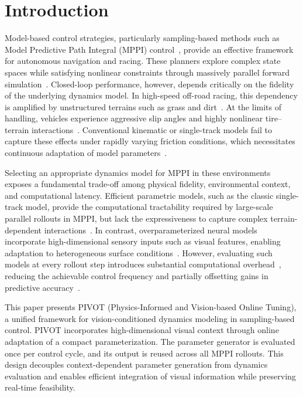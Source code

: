 \chapter{Introduction}
\label{sec:introduction}

Model-based control strategies, particularly sampling-based methods such as Model Predictive Path Integral (MPPI) control~\cite{williams2017model}, provide an effective framework for autonomous navigation and racing. These planners explore complex state spaces while satisfying nonlinear constraints through massively parallel forward simulation~\cite{williams2018information}. Closed-loop performance, however, depends critically on the fidelity of the underlying dynamics model. In high-speed off-road racing, this dependency is amplified by unstructured terrains such as grass and dirt~\cite{xiao2021learning}. At the limits of handling, vehicles experience aggressive slip angles and highly nonlinear tire--terrain interactions~\cite{han2024dynamics, lee2023learning}. Conventional kinematic or single-track models fail to capture these effects under rapidly varying friction conditions, which necessitates continuous adaptation of model parameters~\cite{levy2025meta}.

Selecting an appropriate dynamics model for MPPI in these environments exposes a fundamental trade-off among physical fidelity, environmental context, and computational latency. Efficient parametric models, such as the classic single-track model, provide the computational tractability required by large-scale parallel rollouts in MPPI, but lack the expressiveness to capture complex terrain-dependent interactions~\cite{datar2024terrain}. In contrast, overparameterized neural models incorporate high-dimensional sensory inputs such as visual features, enabling adaptation to heterogeneous surface conditions~\cite{karnan2022vi}. However, evaluating such models at every rollout step introduces substantial computational overhead~\cite{williams2017information, salzmann2023real}, reducing the achievable control frequency and partially offsetting gains in predictive accuracy~\cite{lu2025decremental}.

This paper presents PIVOT (Physics-Informed and Vision-based Online Tuning), a unified framework for vision-conditioned dynamics modeling in sampling-based control. PIVOT incorporates high-dimensional visual context through online adaptation of a compact parameterization. The parameter generator is evaluated once per control cycle, and its output is reused across all MPPI rollouts. This design decouples context-dependent parameter generation from dynamics evaluation and enables efficient integration of visual information while preserving real-time feasibility.


